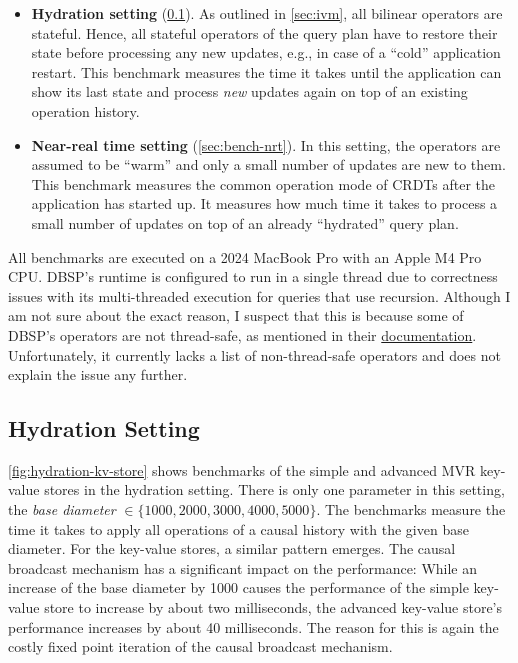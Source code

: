 \begin{itemize}
	\item \textbf{Hydration setting} (\ref{sec:bench-hydration}).
	      As outlined in \ref{sec:ivm}, all bilinear operators are stateful.
	      Hence, all stateful operators of the query plan have to restore
	      their state before processing any new updates, e.g., in case of a
		  ``cold'' application restart. This benchmark measures the time it takes
	      until the application can show its last state and process \emph{new}
		  updates again on top of an existing operation history.
	\item \textbf{Near-real time setting} (\ref{sec:bench-nrt}).
	      In this setting, the operators are assumed to be ``warm'' and only
	      a small number of updates are new to them.
	      This benchmark measures the common operation mode of \acp{CRDT} after
		  the application has started up. It measures how much time it takes
		  to process a small number of updates on top of an already ``hydrated''
		  query plan.
\end{itemize}

All benchmarks are executed on a 2024 MacBook Pro with an Apple M4 Pro CPU.
DBSP's runtime is configured to run in a single thread due to correctness
issues with its multi-threaded execution for queries that use recursion.
Although I am not sure about the exact reason,
I suspect that this is because some of DBSP's operators are not thread-safe,
as mentioned in their
\href{https://docs.rs/dbsp/0.64.0/dbsp/circuit/struct.Runtime.html\#method.init_circuit}{documentation}.
Unfortunately, it currently lacks a list of non-thread-safe operators
and does not explain the issue any further\footnotemark{}.


\subsection{Hydration Setting}\label{sec:bench-hydration}



\ref{fig:hydration-kv-store} shows benchmarks of the simple and advanced
\ac{MVR} key-value stores in the hydration setting.
There is only one parameter in this setting,
the \emph{base diameter} \(\in \{1000, 2000, 3000, 4000, 5000\}\).
The benchmarks measure the time it takes to apply all operations of a
causal history with the given base diameter.
For the key-value stores, a similar pattern emerges.
The causal broadcast mechanism has a significant impact on the performance:
While an increase of the base diameter by 1000 causes the performance of the
simple key-value store to increase by about two milliseconds,
the advanced key-value store's performance increases by about 40 milliseconds.
The reason for this is again the costly fixed point iteration of the causal
broadcast mechanism.

